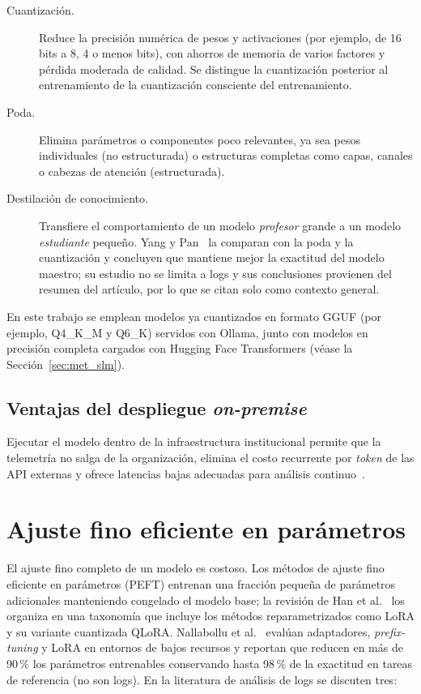 \begin{description}
  \item[Cuantización.] Reduce la precisión numérica de pesos y activaciones (por ejemplo, de 16 bits a 8, 4 o menos bits), con ahorros de memoria de varios factores y pérdida moderada de calidad. Se distingue la cuantización posterior al entrenamiento de la cuantización consciente del entrenamiento.
  \item[Poda.] Elimina parámetros o componentes poco relevantes, ya sea pesos individuales (no estructurada) o estructuras completas como capas, canales o cabezas de atención (estructurada).
  \item[Destilación de conocimiento.] Transfiere el comportamiento de un modelo \textit{profesor} grande a un modelo \textit{estudiante} pequeño. Yang y Pan~\cite{yang2025_lightweight} la comparan con la poda y la cuantización y concluyen que mantiene mejor la exactitud del modelo maestro; su estudio no se limita a logs y sus conclusiones provienen del resumen del artículo, por lo que se citan solo como contexto general.
\end{description}

En este trabajo se emplean modelos ya cuantizados en formato GGUF (por ejemplo, Q4\_K\_M y Q6\_K) servidos con Ollama, junto con modelos en precisión completa cargados con Hugging Face Transformers (véase la Sección~\ref{sec:met_slm}).

\subsection{Ventajas del despliegue \textit{on-premise}}

Ejecutar el modelo dentro de la infraestructura institucional permite que la telemetría no salga de la organización, elimina el costo recurrente por \textit{token} de las API externas y ofrece latencias bajas adecuadas para análisis continuo~\cite{wang2025_slm_survey, pardeshi2026_smartllm, ma2026_adaptivelog}. %

\section{Ajuste fino eficiente en parámetros}\label{sec:mt_peft}

El ajuste fino completo de un modelo es costoso. Los métodos de ajuste fino eficiente en parámetros (PEFT) entrenan una fracción pequeña de parámetros adicionales manteniendo congelado el modelo base; la revisión de Han et al.~\cite{han2024_peft_survey} los organiza en una taxonomía que incluye los métodos reparametrizados como LoRA y su variante cuantizada QLoRA. Nallabollu et al.~\cite{nallabollu2026_peft_cloud} evalúan adaptadores, \textit{prefix-tuning} y LoRA en entornos de bajos recursos y reportan que reducen en más de 90\,\% los parámetros entrenables conservando hasta 98\,\% de la exactitud en tareas de referencia (no son logs). En la literatura de análisis de logs se discuten tres:

